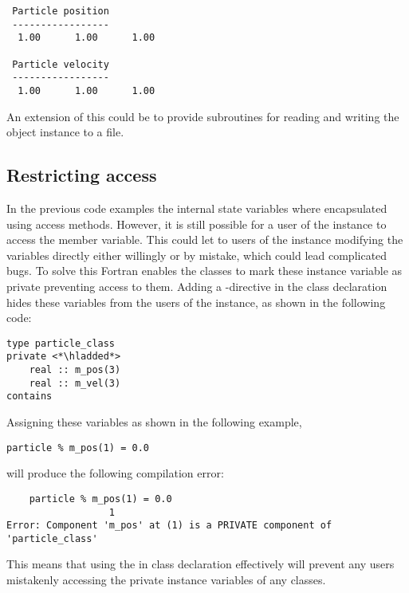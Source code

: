 \begin{lstlisting}
 Particle position
 -----------------
  1.00      1.00      1.00    
 
 Particle velocity
 -----------------
  1.00      1.00      1.00    
\end{lstlisting}

An extension of this could be to provide subroutines for reading and writing the object instance to a file.

\subsection{Restricting access}

In the previous code examples the internal state variables where encapsulated using access methods. However, it is still possible for a user of the instance to access the member variable. This could let to users of the instance modifying the variables directly either willingly or by mistake, which could lead complicated bugs. To solve this Fortran enables the classes to mark these instance variable as private preventing access to them. Adding a -directive in the class declaration hides these variables from the users of the instance, as shown in the following code:

\fmode

\begin{lstlisting}
type particle_class
private <*\hladded*>
    real :: m_pos(3)
    real :: m_vel(3)
contains
\end{lstlisting}

Assigning these variables as shown in the following example,

\begin{lstlisting}
particle % m_pos(1) = 0.0
\end{lstlisting}

will produce the following compilation error:

\cmdmode

\begin{lstlisting}
    particle % m_pos(1) = 0.0
                  1
Error: Component 'm_pos' at (1) is a PRIVATE component of 'particle_class'
\end{lstlisting}

\fmode

This means that using the  in class declaration effectively will prevent any users mistakenly accessing the private instance variables of any classes. 

